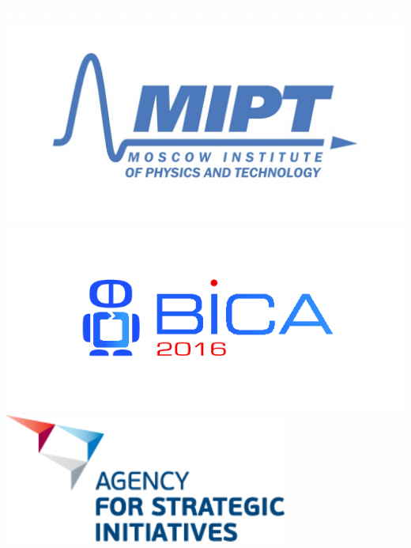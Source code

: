 \documentclass[default]{beamer}
\begin{document}
\begin{frame}
\begin{columns}
\begin{column}{0.15\textwidth}
				\vspace{7pt}
				\includegraphics[width=\textwidth]{advert/mipt_en.jpg}
				\vspace{7pt}
				\includegraphics[width=\textwidth]{advert/bica2016.png}
				\vspace{7pt}
				\includegraphics[width=0.7\textwidth]{advert/asi_en.png}
			\end{column}
		\end{columns}
	\end{frame}
\end{document}
